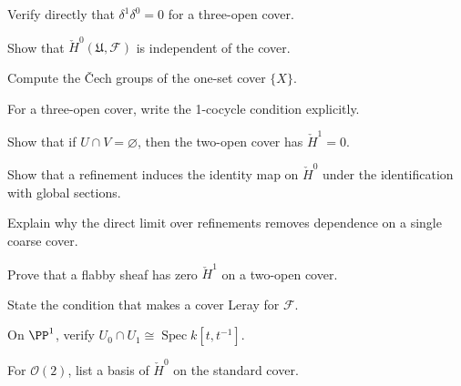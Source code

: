 \begin{exercise}\label{exr:vi47-02}
Verify directly that $\delta^1\delta^0=0$ for a three-open cover.
\end{exercise}

\begin{exercise}\label{exr:vi47-03}
Show that $\check H^0(\mathfrak U,\mathcal F)$ is independent of the cover.
\end{exercise}

\begin{exercise}\label{exr:vi47-04}
Compute the \v{C}ech groups of the one-set cover $\{X\}$.
\end{exercise}

\begin{exercise}\label{exr:vi47-05}
For a three-open cover, write the 1-cocycle condition explicitly.
\end{exercise}

\begin{exercise}\label{exr:vi47-06}
Show that if $U\cap V=\varnothing$, then the two-open cover has $\check H^1=0$.
\end{exercise}

\begin{exercise}\label{exr:vi47-07}
Show that a refinement induces the identity map on $\check H^0$ under the identification with global sections.
\end{exercise}

\begin{exercise}\label{exr:vi47-08}
Explain why the direct limit over refinements removes dependence on a single coarse cover.
\end{exercise}

\begin{exercise}\label{exr:vi47-09}
Prove that a flabby sheaf has zero $\check H^1$ on a two-open cover.
\end{exercise}

\begin{exercise}\label{exr:vi47-10}
State the condition that makes a cover Leray for $\mathcal F$.
\end{exercise}

\begin{exercise}\label{exr:vi47-11}
On $\PP^1$, verify $U_0\cap U_1\cong\operatorname{Spec}k[t,t^{-1}]$.
\end{exercise}

\begin{exercise}\label{exr:vi47-12}
For $\mathcal O(2)$, list a basis of $\check H^0$ on the standard cover.
\end{exercise}

